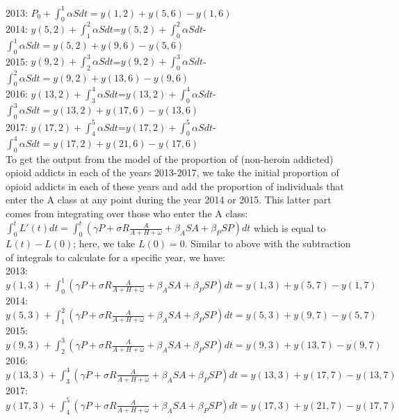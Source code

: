 \documentclass[12pt]{article}
\begin{document}
2013: $P_0 + \int_0^1 \alpha S dt= y(1,2)+y(5,6)-y(1,6)$ \\
2014: $y(5,2)+\int_1^2 \alpha S dt$=$y(5,2)+\int_0^2 \alpha S dt$- $\int_0^1 \alpha S dt=y(5,2)+y(9,6)-y(5,6)$ \\
2015: $y(9,2)+\int_2^3 \alpha S dt$=$y(9,2)+\int_0^3 \alpha S dt$- $\int_0^2 \alpha S dt=y(9,2)+y(13,6)-y(9,6)$ \\
2016: $y(13,2)+\int_3^4 \alpha S dt$=$y(13,2)+\int_0^4 \alpha S dt$- $\int_0^3 \alpha S dt=y(13,2)+y(17,6)-y(13,6)$ \\
2017: $y(17,2)+\int_4^5 \alpha S dt$=$y(17,2)+\int_0^5\alpha S dt$- $\int_0^4 \alpha S dt=y(17,2)+y(21,6)-y(17,6)$ \\


 To get the output from the model of the proportion of (non-heroin addicted) opioid addicts in each of the years 2013-2017, we take the initial proportion of opioid addicts in each of these years and add the proportion of individuals that enter the A class at any point during the year 2014 or 2015. This latter part comes from integrating over those who enter the A class: $\int_0^t L'(t)dt=\int_0^t (\gamma P + \sigma R\frac{A}{A+H+\omega}+\beta_A SA+\beta_P SP) dt$ which is equal to $L(t)-L(0)$; here, we take $L(0)=0.$ Similar to above with the subtraction of integrals to calculate for a specific year, we have: \\
 2013: $y(1,3)+\int_0^1 (\gamma P + \sigma R\frac{A}{A+H+\omega}+\beta_A SA+\beta_P SP) dt= y(1,3)+y(5,7)-y(1,7)$ \\
 2014: $y(5,3)+\int_1^2 (\gamma P + \sigma R\frac{A}{A+H+\omega}+\beta_A SA+\beta_P SP) dt= y(5,3)+y(9,7)-y(5,7)$ \\
 2015: $y(9,3)+\int_2^3 (\gamma P + \sigma R\frac{A}{A+H+\omega}+\beta_A SA+\beta_P SP) dt= y(9,3)+y(13,7)-y(9,7)$ \\
  2016: $y(13,3)+\int_3^4 (\gamma P + \sigma R\frac{A}{A+H+\omega}+\beta_A SA+\beta_P SP) dt= y(13,3)+y(17,7)-y(13,7)$ \\
   2017: $y(17,3)+\int_4^5 (\gamma P + \sigma R\frac{A}{A+H+\omega}+\beta_A SA+\beta_P SP) dt= y(17,3)+y(21,7)-y(17,7)$ \\
\end{document}
